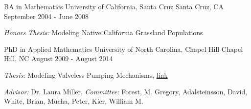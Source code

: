 


\begin{cventries}

  \cventry
    {BA in Mathematics} %
    {University of California, Santa Cruz} %
    {Santa Cruz, CA} %
    {September 2004 - June 2008} %
    {
    \begin{cvitems}
     \item{\textit{Honors Thesis:} Modeling Native California Grassland Populations}
     \end{cvitems}
    }

  \cventry
    {PhD in Applied Mathematics} %
    {University of North Carolina, Chapel Hill} %
    {Chapel Hill, NC} %
    {August 2009 - August 2014} %
    {
    \begin{cvitems}
     \item{\textit{Thesis:} Modeling Valveless Pumping Mechanisms, \href{https://cdr.lib.unc.edu/concern/dissertations/rb68xc402}{link}}
     \item{\textit{Advisor:} Dr. Laura Miller, \textit{Committee:} Forest, M. Gregory, Adalsteinsson, David, White, Brian, Mucha, Peter, Kier, William M.}
     \end{cvitems}
    }

    
\end{cventries}
